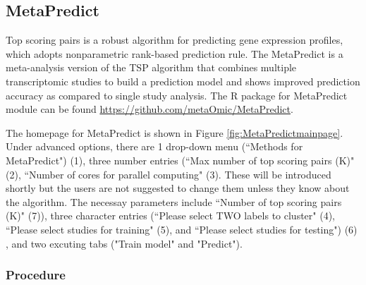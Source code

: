 \subsection{MetaPredict}

Top scoring pairs is a robust algorithm for predicting gene expression profiles,
which adopts nonparametric rank-based prediction rule.
The MetaPredict is a meta-analysis version of the TSP algorithm that combines multiple transcriptomic studies to build a prediction model and shows improved 
prediction accuracy as compared to single study analysis.
The R package for MetaPredict module can be found \url{https://github.com/metaOmic/MetaPredict}.

The homepage for MetaPredict is shown in Figure \ref{fig:MetaPredictmainpage}.
Under advanced options,  there are 1 drop-down menu (``Methods for MetaPredict") {\color{red} (1)}, three number entries (``Max number of top scoring pairs (K)" {\color{red} (2)}, ``Number of cores for parallel computing" {\color{red} (3)}.
These will be introduced shortly but the users are not suggested to change them unless they know about the algorithm.
The necessay parameters include ``Number of top scoring pairs (K)" {\color{red} (7)}), three character entries (``Please select TWO labels to cluster" {\color{red} (4)}, ``Please select studies for training" {\color{red} (5)}, and ``Please select studies for testing") {\color{red} (6)} , and two excuting tabs ("Train model" and "Predict"). 

\subsubsection{Procedure}

